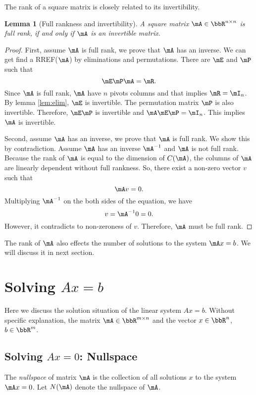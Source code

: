\documentclass[11pt]{article}
\theoremstyle{plain}
\newtheorem{lem}{Lemma}
\theoremstyle{definition}
\begin{document}
\vspace{.2cm}
The rank of a square matrix is closely related to its invertibility. 
\begin{lem}[Full rankness and invertibility]\label{lem:fullrank} A square matrix $\mA \in \bbR^{n \times n}$ is full rank, if and only if $\mA$ is an invertible matrix.
\end{lem}

\begin{proof}
	First, assume $\mA$ is full rank, we prove that $\mA$ has an inverse.
	We can get find a RREF($\mA$) by eliminations and permutations. There are $\mE$ and $\mP$ such that
	\[ \mE \mP \mA =  \mR. \]
	Since $\mA$ is full rank, $\mA$ have $n$ pivots columns and that implies $\mR = \mI_n$. By lemma \ref{lem:elim}, $\mE$ is invertible. The permutation matrix $\mP$ is also invertible. Therefore, $\mE \mP$ is invertible and $\mA \mE \mP= \mI_n$. This implies $\mA$ is invertible.
	
	Second, assume $\mA$ has an inverse, we prove that $\mA$ is full rank. 
	We show this by contradiction. Assume $\mA$ has an inverse $\mA^{-1}$ and $\mA$ is not full rank. Because the rank of $\mA$ is equal to the dimension of $C(\mA)$, the columns of $\mA$ are linearly dependent without full rankness. So, there exist a non-zero vector $v$ such that \[ \mA v = 0.\] Multiplying $\mA^{-1}$ on the both sides of the equation, we have \[ v = \mA^{-1} 0 = 0.\] However, it contradicts to  non-zeroness of $v$. Therefore, $\mA$ must be full rank.
\end{proof}

The rank of $\mA$ also effects the number of solutions to the system $\mA x = b$. We will discuss it in next section.

\section{Solving $Ax = b$}

Here we discuss the solution situation of the linear system $Ax = b$. Without specific explanation, the matrix $\mA \in \bbR^{m \times n}$ and the vector $x \in \bbR^n$, $b \in \bbR^m$.

\subsection{Solving $Ax = 0$: Nullspace}
The \textit{nullspace} of matrix $\mA$ is the collection of all solutions $x$ to the system $\mA x = 0$. Let $N(\mA)$ denote the nullspace of $\mA$.
\end{document}
